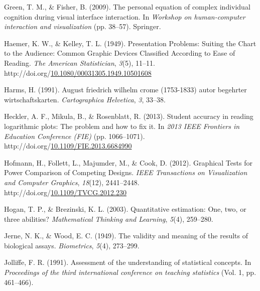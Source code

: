 \documentclass[print]{nuthesis}
\newlength{\cslhangindent}
\newenvironment{CSLReferences}%
{\setlength{\parindent}{0pt}%
\everypar{\setlength{\hangindent}{\cslhangindent}}\ignorespaces}%
{\par}
\begin{document}
\begin{CSLReferences}{1}{0}
\leavevmode{}%
Green, T. M., \& Fisher, B. (2009). The personal equation of complex individual cognition during visual interface interaction. In \emph{Workshop on human-computer interaction and visualization} (pp. 38--57). Springer.

\leavevmode{}%
Haemer, K. W., \& Kelley, T. L. (1949). Presentation {Problems}: {Suiting} the {Chart} to the {Audience}: {Common} {Graphic} {Devices} {Classified} {According} to {Ease} of {Reading}. \emph{The American Statistician}, \emph{3}(5), 11--11. http://doi.org/\href{https://doi.org/10.1080/00031305.1949.10501608}{10.1080/00031305.1949.10501608}

\leavevmode{}%
Harms, H. (1991). August friedrich wilhelm crome (1753-1833) autor begehrter wirtschaftskarten. \emph{Cartographica Helvetica}, \emph{3}, 33--38.

\leavevmode{}%
Heckler, A. F., Mikula, B., \& Rosenblatt, R. (2013). Student accuracy in reading logarithmic plots: {The} problem and how to fix it. In \emph{2013 {IEEE} {Frontiers} in {Education} {Conference} ({FIE})} (pp. 1066--1071). http://doi.org/\href{https://doi.org/10.1109/FIE.2013.6684990}{10.1109/FIE.2013.6684990}

\leavevmode{}%
Hofmann, H., Follett, L., Majumder, M., \& Cook, D. (2012). Graphical {Tests} for {Power} {Comparison} of {Competing} {Designs}. \emph{IEEE Transactions on Visualization and Computer Graphics}, \emph{18}(12), 2441--2448. http://doi.org/\href{https://doi.org/10.1109/TVCG.2012.230}{10.1109/TVCG.2012.230}

\leavevmode{}%
Hogan, T. P., \& Brezinski, K. L. (2003). Quantitative estimation: One, two, or three abilities? \emph{Mathematical Thinking and Learning}, \emph{5}(4), 259--280.

\leavevmode{}%
Jerne, N. K., \& Wood, E. C. (1949). The validity and meaning of the results of biological assays. \emph{Biometrics}, \emph{5}(4), 273--299.

\leavevmode{}%
Jolliffe, F. R. (1991). Assessment of the understanding of statistical concepts. In \emph{Proceedings of the third international conference on teaching statistics} (Vol. 1, pp. 461--466).


\end{CSLReferences}
\end{document}

